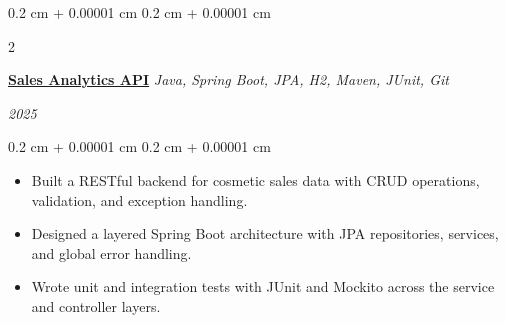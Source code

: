 \documentclass[10pt, letterpaper]{article}
\newenvironment{highlights}{
    \begin{itemize}[
        topsep=0.10 cm,
        parsep=0.10 cm,
        partopsep=0pt,
        itemsep=0pt,
        leftmargin=0.4 cm + 10pt
    ]
}{
    \end{itemize}
} %
\newenvironment{onecolentry}{
    \begin{adjustwidth}{
        0.2 cm + 0.00001 cm
    }{
        0.2 cm + 0.00001 cm
    }
}{
    \end{adjustwidth}
} %
\newenvironment{twocolentry}[2][]{
    \onecolentry
    \def\secondColumn{#2}
    \setcolumnwidth{\fill, 4.5 cm}
    \begin{paracol}{2}
}{
    \switchcolumn \raggedleft \secondColumn
    \end{paracol}
    \endonecolentry
} %
\begin{document}
    \vspace{0.2 cm}

        \begin{twocolentry}
        {
            \textit{2025}
        }
        {
            \textbf{\href{https://github.com/wovensoul/sales-analytics}{Sales Analytics API}} \textbar{}
            \textit{Java, Spring Boot, JPA, H2, Maven, JUnit, Git}
        }
        \end{twocolentry}
        \vspace{0.1 cm}
        \begin{onecolentry}
            \begin{highlights}
                \item Built a RESTful backend for cosmetic sales data with CRUD operations, validation, and exception handling.
                \item Designed a layered Spring Boot architecture with JPA repositories, services, and global error handling.
                \item Wrote unit and integration tests with JUnit and Mockito across the service and controller layers.
            \end{highlights}
        \end{onecolentry}



\end{document}

